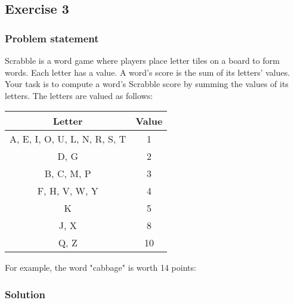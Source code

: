 \documentclass{report}
\begin{document}
    \pagebreak 
    \subsection{Exercise 3}
    \bigbreak \noindent 
    \subsubsection{Problem statement}
    \bigbreak \noindent 
    Scrabble is a word game where players place letter tiles on a board to form words. Each letter has a value. A word's score is the sum of its letters' values.
    \bigbreak \noindent 
    Your task is to compute a word's Scrabble score by summing the values of its letters.
    \bigbreak \noindent 
    The letters are valued as follows:
    \bigbreak \noindent 
    \begin{center}
        \begin{tabular}{c|c}
            Letter	&Value \\
            \hline
            A, E, I, O, U, L, N, R, S, T	&1 \\
            D, G	&2 \\
            B, C, M, P	&3 \\
            F, H, V, W, Y	&4 \\
            K	&5 \\
            J, X	&8 \\
            Q, Z	&10
        \end{tabular}
    \end{center}
    \bigbreak \noindent 
    For example, the word "cabbage" is worth 14 points:
    \bigbreak \noindent 
    \subsubsection{Solution}
    \bigbreak \noindent 
\end{document}
